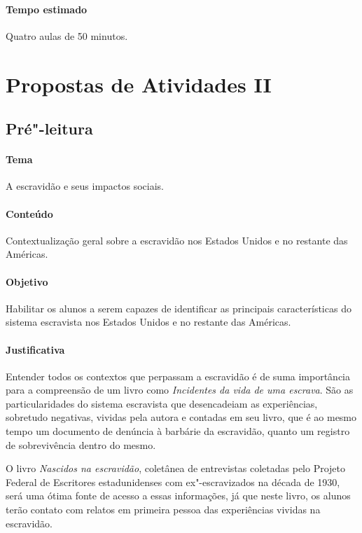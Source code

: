 \documentclass[11pt]{extarticle}
\begin{document}
 \paragraph{Tempo estimado} Quatro aulas de 50 minutos.



\section{Propostas de Atividades II}



\subsection{Pré"-leitura}

\paragraph{Tema} A escravidão e seus impactos sociais.

\paragraph{Conteúdo} Contextualização geral sobre a escravidão nos Estados Unidos e 
no restante das Américas.

\paragraph{Objetivo} Habilitar os alunos a serem capazes de identificar
as principais características do sistema escravista nos Estados Unidos e 
no restante das Américas.

\paragraph{Justificativa} Entender todos os contextos que perpassam
a escravidão é de suma importância para a compreensão de um livro
como \emph{Incidentes da vida de uma escrava}. São as particularidades
do sistema escravista que desencadeiam as experiências, sobretudo negativas,
vividas pela autora e contadas em seu livro, que é ao mesmo tempo
um documento de denúncia à barbárie da escravidão, quanto
um registro de sobrevivência dentro do mesmo. 


O livro \emph{Nascidos na escravidão}, coletânea de entrevistas coletadas
 pelo Projeto Federal de Escritores estadunidenses com ex"-escravizados 
 na década de 1930, será uma ótima fonte de acesso a essas informações,
 já que neste livro, os alunos terão contato com relatos em primeira
 pessoa das experiências vividas na escravidão. 
\end{document}
